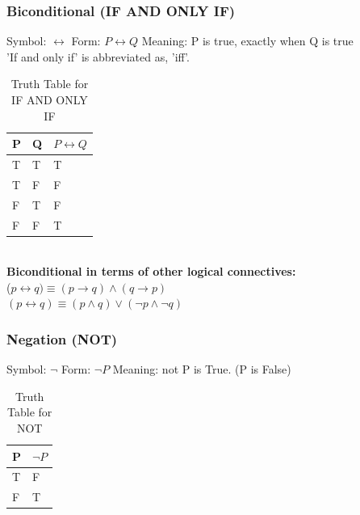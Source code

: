 \documentclass{article}
\begin{document}
\subsubsection*{Biconditional (IF AND ONLY IF)}
Symbol: $\leftrightarrow$ \hspace{1.5cm}
Form: $P \leftrightarrow Q$ \hspace{1.5cm}
Meaning: P is true, exactly when Q is true \\
'If and only if' is abbreviated as, 'iff'.\\
\begin{table}[h]
\centering
\renewcommand{\arraystretch}{1.01}
\begin{tabular}{|>{\centering\arraybackslash}p{2cm}|>{\centering\arraybackslash}p{2cm}|>{\centering\arraybackslash}p{2cm}|}
\hline
P & Q &  $P \leftrightarrow Q$\\
\hline
T & T & T \\
\hline
T & F & F \\
\hline
F & T & F \\
\hline
F & F & T \\
\hline
\end{tabular}
\caption{Truth Table for IF AND ONLY IF}
\end{table}\\
\textbf{Biconditional in terms of other logical connectives:}\\
($p \leftrightarrow q) \equiv (p \rightarrow q) \land (q \rightarrow p)$\\
$(p \leftrightarrow q) \equiv (p \land q) \lor (\neg p \land \neg q)$\\

\subsubsection*{Negation (NOT)}
Symbol: $\neg$ \hspace{1.5cm}
Form: $\neg P$ \hspace{1.5cm}
Meaning: not P is True. (P is False) \\
\begin{table}[h]
\centering
\renewcommand{\arraystretch}{1.01}
\begin{tabular}{|>{\centering\arraybackslash}p{2cm}|>{\centering\arraybackslash}p{2cm}|}
\hline
P & $\neg P $\\
\hline
T & F\\
\hline
F & T \\
\hline
\end{tabular}
\caption{Truth Table for NOT}
\end{table}\\
\end{document}
